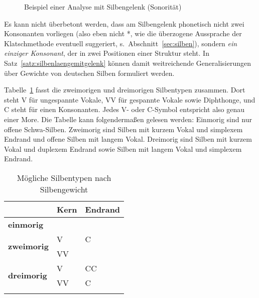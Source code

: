 \begin{figure}[h]
  \centering
  \caption{Beispiel einer Analyse mit Silbengelenk (Sonorität)}
  \label{fig:silbgel002}
\end{figure}

Es kann nicht überbetont werden, dass am Silbengelenk phonetisch nicht zwei Konsonanten vorliegen (also eben nicht *\textipa{[mIt.t@]}, wie die überzogene Aussprache der Klatschmethode eventuell suggeriert, s.\ Abschnitt~\ref{sec:silben}), sondern \textit{ein einziger Konsonant}, der in zwei Positionen einer Struktur steht.
In Satz~\ref{satz:silbenlaengemitgelenk} können damit weitreichende Generalisierungen über Gewichte von deutschen Silben formuliert werden.


Tabelle~\ref{tab:morentypen} fasst die zweimorigen und dreimorigen Silbentypen zusammen.
Dort steht V für ungespannte Vokale, VV für gespannte Vokale sowie Diphthonge, und C steht für einen Konsonanten.
Jedes V- oder C-Symbol entspricht also genau einer More.
Die Tabelle kann folgendermaßen gelesen werden:
Einmorig sind nur offene Schwa-Silben.
Zweimorig sind Silben mit kurzem Vokal und simplexem Endrand und offene Silben mit langem Vokal.
Dreimorig sind Silben mit kurzem Vokal und duplexem Endrand sowie Silben mit langem Vokal und simplexem Endrand.

\begin{table}[!htbp]
  \centering
  \begin{tabular}{lll}
    \lsptoprule
     & \textbf{Kern} & \textbf{Endrand} \\
    \midrule
    \textbf{einmorig} & \textipa{@} & \\
    \midrule
    \multirow{2}{*}{\textbf{zweimorig}} & V & C \\
    & VV & \\
    \midrule
    \multirow{2}{*}{\textbf{dreimorig}} & V & CC \\
    & VV & C \\
    \lspbottomrule
  \end{tabular}
  \caption{Mögliche Silbentypen nach Silbengewicht}
  \label{tab:morentypen}
\end{table}

